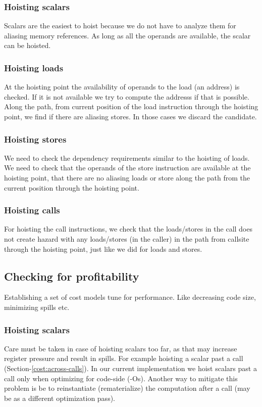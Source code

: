 \documentclass{sig-alternate}
\begin{document}
\subsubsection{Hoisting scalars}
Scalars are the easiest to hoist because we do not have to analyze them for
aliasing memory references. As long as all the operands are available, the
scalar can be hoisted.

\subsubsection{Hoisting loads}
At the hoisting point the availability of operands to the load (an address) is
checked. If it is not available we try to compute the addresss if that is
possible.  Along the path, from current position of the load instruction through
the hoisting point, we find if there are aliasing stores. In those cases we
discard the candidate.

\subsubsection{Hoisting stores}
We need to check the dependency requirements similar to the hoisting of
loads. We need to check that the operands of the store instruction are available
at the hoisting point, that there are no aliasing loads or store along the path
from the current position through the hoisting point.

\subsubsection{Hoisting calls}
For hoisting the call instructions, we check that the loads/stores in the call
does not create hazard with any loads/stores (in the caller) in the path from
callsite through the hoisting point, just like we did for loads and stores.

\subsection{Checking for profitability}
Establishing a set of cost models tune for performance. Like decreasing code
size, minimizing spills etc.

\subsubsection{Hoisting scalars}
Care must be taken in case of hoisting scalars too far, as that may increase
register pressure and result in spills. For example hoisting a scalar past a
call (Section-\ref{cost:across-calls}). In our current implementation we hoist
scalars past a call only when optimizing for code-side (-Os). Another way to
mitigate this problem is be to reinstantiate (rematerialize) the computation
after a call (may be as a different optimization pass).
\end{document}
